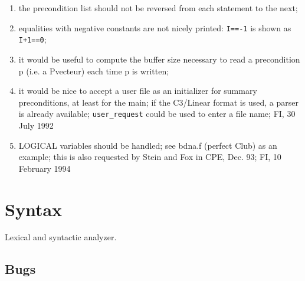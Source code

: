 \begin{enumerate}

  \item the precondition list should not be reversed from each statement
	to the next;

  \item equalities with negative constants are not nicely printed:
	\verb+I==-1+ is shown as \verb/I+1==0/;

  \item it would be useful to compute the buffer size necessary to
	read a precondition p (i.e. a Pvecteur) each time p is
	written;

  \item it would be nice to accept a user file as an initializer for
	summary preconditions, at least for the main; if the C3/Linear
	format is used, a parser is already available; \verb+user_request+
	could be used to enter a file name; FI, 30 July 1992

  \item LOGICAL variables should be handled; see bdna.f (perfect Club)
	as an example; this is also requested by Stein and Fox in CPE,
	Dec. 93; FI, 10 February 1994

\end{enumerate}

\section{Syntax}

Lexical and syntactic analyzer. 

%

\subsection{Bugs}

